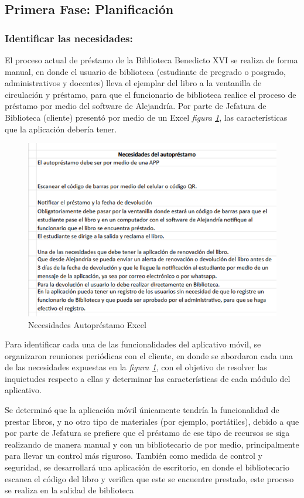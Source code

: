 \documentclass[spanish]{ieee_upb}
\begin{document}
\subsection{Primera Fase: Planificación}
\subsubsection{Identificar las necesidades:}
El proceso actual de préstamo de la Biblioteca Benedicto XVI se realiza de forma manual, en donde el usuario de biblioteca (estudiante de pregrado o posgrado, administrativos y docentes) lleva el ejemplar del libro a la ventanilla de circulación y préstamo, para que el funcionario de biblioteca realice el proceso de préstamo por medio del software de Alejandría.  Por parte de Jefatura de Biblioteca (cliente) presentó por medio de un Excel \textit{figura \ref{fig:excelNecesidades}}, las características que la aplicación debería tener. 

\begin{figure}[htpb]
    \centering
    \includegraphics[width=0.7\linewidth]{img/necesidadesAutoprestamo.png}
    \caption[Características Autopréstamo]{Necesidades Autopréstamo Excel}
    \label{fig:excelNecesidades}
\end{figure}

Para identificar cada una de las funcionalidades del aplicativo móvil, se organizaron reuniones periódicas con el cliente, en donde se abordaron cada una de las necesidades expuestas en la \textit{figura \ref{fig:excelNecesidades}}, con el objetivo de resolver las inquietudes respecto a ellas y determinar las características de cada módulo del aplicativo.
\vspace{0.3 cm}

Se determinó que la aplicación móvil únicamente tendría la funcionalidad de prestar libros, y no otro tipo de materiales (por ejemplo, portátiles), debido a que por parte de Jefatura se prefiere que el préstamo de ese tipo de recursos se siga realizando de manera manual y con un bibliotecario de por medio, principalmente para llevar un control más riguroso. También como medida de control y seguridad, se desarrollará una aplicación de escritorio, en donde el bibliotecario escanea el código del libro y verifica que este se encuentre prestado, este proceso se realiza en la salidad de biblioteca
\vspace{0.3 cm}
\end{document}
